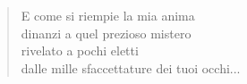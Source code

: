 
\begin{verse}
    E come si riempie la mia anima\\
    dinanzi a quel prezioso mistero\\
    rivelato a pochi eletti\\
    dalle mille sfaccettature dei tuoi occhi...
\end{verse}